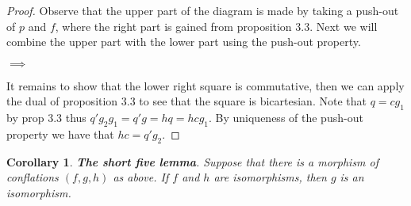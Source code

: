 \documentclass[11pt]{article}
\newtheorem{corollary}{Corollary}[theorem]
\theoremstyle{definition}
\theoremstyle{remark}
\begin{document}
            \begin{proof}
                Observe that the upper part of the diagram is made by taking a push-out of $p$ and $f$, where the right part is gained from proposition 3.3. Next we will combine the upper part with the lower part using the push-out property.
                \begin{center}
                     $\implies$
                \end{center}
                It remains to show that the lower right square is commutative, then we can apply the dual of proposition 3.3 to see that the square is bicartesian. Note that $q=cg_1$ by prop 3.3 thus $q'g_2g_1=q'g=hq=hcg_1$. By uniqueness of the push-out property we have that $hc=q'g_2$.
            \end{proof}

            \begin{corollary}
                \textbf{The short five lemma}. Suppose that there is a morphism of conflations $(f,g,h)$ as above. If $f$ and $h$ are isomorphisms, then $g$ is an isomorphism.
            \end{corollary}
\end{document}
